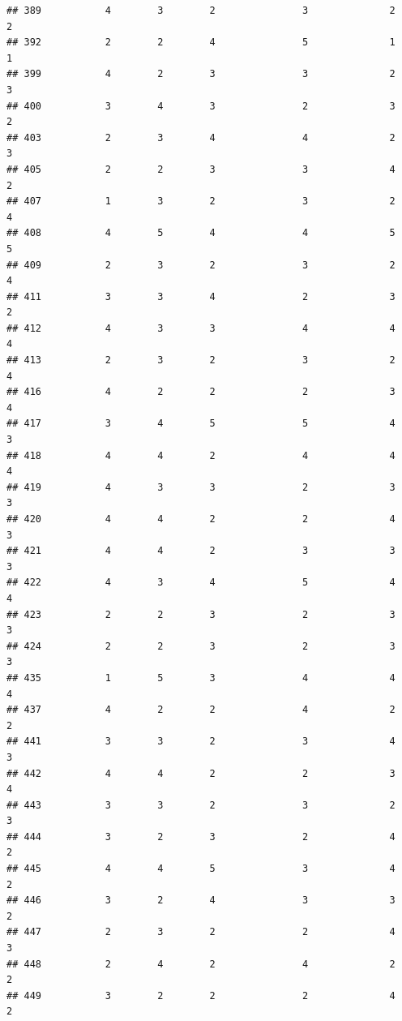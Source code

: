 \documentclass[
]{article}
\begin{document}
\begin{verbatim}
## 389           4        3        2               3              2             2
## 392           2        2        4               5              1             1
## 399           4        2        3               3              2             3
## 400           3        4        3               2              3             2
## 403           2        3        4               4              2             3
## 405           2        2        3               3              4             2
## 407           1        3        2               3              2             4
## 408           4        5        4               4              5             5
## 409           2        3        2               3              2             4
## 411           3        3        4               2              3             2
## 412           4        3        3               4              4             4
## 413           2        3        2               3              2             4
## 416           4        2        2               2              3             4
## 417           3        4        5               5              4             3
## 418           4        4        2               4              4             4
## 419           4        3        3               2              3             3
## 420           4        4        2               2              4             3
## 421           4        4        2               3              3             3
## 422           4        3        4               5              4             4
## 423           2        2        3               2              3             3
## 424           2        2        3               2              3             3
## 435           1        5        3               4              4             4
## 437           4        2        2               4              2             2
## 441           3        3        2               3              4             3
## 442           4        4        2               2              3             4
## 443           3        3        2               3              2             3
## 444           3        2        3               2              4             2
## 445           4        4        5               3              4             2
## 446           3        2        4               3              3             2
## 447           2        3        2               2              4             3
## 448           2        4        2               4              2             2
## 449           3        2        2               2              4             2

\end{verbatim}
\end{document}
